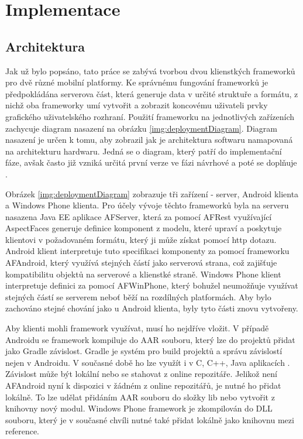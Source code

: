 \chapter{Implementace}
\section{Architektura}
Jak už bylo popsáno, tato práce se zabývá tvorbou dvou klienstkých frameworků pro dvě různé mobilní platformy. Ke správnému fungování frameworků je předpokládána serverova část, která generuje data v určité struktuře a formátu, z nichž oba frameworky umí vytvořit a zobrazit koncovému uživateli prvky grafického uživatelského rozhraní. Použití frameworku na jednotlivých zařízeních zachycuje diagram nasazení na obrázku \ref{img:deploymentDiagram}. Diagram nasazení je určen k tomu, aby zobrazil jak je architektura softwaru namapovaná na architekturu hardwaru. Jedná se o diagram, který patří do implementační fáze, avšak často již vzniká určitá první verze ve fázi návrhové a poté se doplňuje \cite{UmlArlow}.

Obrázek \ref{img:deploymentDiagram} zobrazuje tři zařízení - server, Android klienta a Windows Phone klienta. Pro účely vývoje těchto frameworků byla na serveru nasazena Java EE aplikace AFServer, která za pomocí AFRest \cite{tomasek-thesis} využívající AspectFaces \cite{aspect-faces} generuje definice komponent z modelu, které upraví a poskytuje klientovi v požadovaném formátu, který ji může získat pomocí http dotazu. Android klient interpretuje tuto specifikaci komponenty za pomocí frameworku AFAndroid, který využívá stejných částí jako serverová strana, což zajišťuje kompatibilitu objektů na serverové a klienstké straně. Windows Phone klient interpretuje definici za pomocí AFWinPhone, který bohužel neumožňuje využívat stejných částí se serverem neboť běží na rozdílných platformách. Aby bylo zachováno stejné chování jako u Android klienta, byly tyto části znovu vytvořeny.

Aby klienti mohli framework využívat, musí ho nejdříve vložit. V případě Androidu se framework kompiluje do AAR souboru, který lze do projektů přidat jako Gradle závislost. Gradle je systém pro build projektů a správu závislostí nejen v Androidu. V současné době ho lze využít i v C, C++, Java aplikacích \cite{gradle}. Závislost může být lokální nebo se stahovat z online repozitáře. Jelikož není AFAndroid nyní k dispozici v žádném z online repozitářů, je nutné ho přidat lokálně. To lze udělat přidáním AAR souboru do složky lib nebo vytvořit z knihovny nový modul. Windows Phone framework je zkompilován do DLL souboru, který je v současné chvíli nutné také přidat lokálně jako knihovnu mezi reference.


